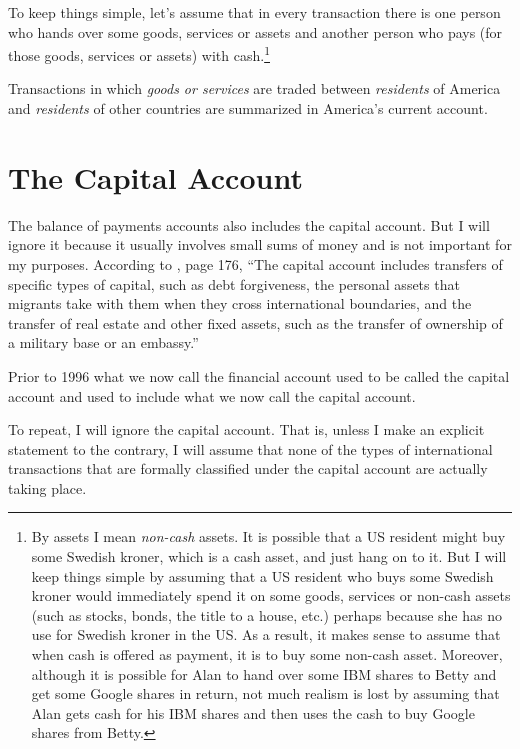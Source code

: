 \documentclass[
  letterpaper,
]{book}
\theoremstyle{plain}
\theoremstyle{remark}
\begin{document}
To keep things simple, let's assume that in every transaction there is
one person who hands over some goods, services or assets and another
person who pays (for those goods, services or assets) with
cash.\footnote{By assets I mean \emph{non-cash} assets. It is possible
  that a US resident might buy some Swedish kroner, which is a cash
  asset, and just hang on to it. But I will keep things simple by
  assuming that a US resident who buys some Swedish kroner would
  immediately spend it on some goods, services or non-cash assets (such
  as stocks, bonds, the title to a house, etc.) perhaps because she has
  no use for Swedish kroner in the US. As a result, it makes sense to
  assume that when cash is offered as payment, it is to buy some
  non-cash asset. Moreover, although it is possible for Alan to hand
  over some IBM shares to Betty and get some Google shares in return,
  not much realism is lost by assuming that Alan gets cash for his IBM
  shares and then uses the cash to buy Google shares from Betty.}

Transactions in which \emph{goods or services} are traded between
\emph{residents} of America and \emph{residents} of other countries are
summarized in America's current
account.

\section{The Capital Account}\label{sec-capacc}

The balance of payments accounts also includes the capital
account. But I will ignore it
because it usually involves small sums of money and is not important for
my purposes. According to \textcite{gerber2002}, page 176, ``The capital
account includes transfers of specific types of capital, such as debt
forgiveness, the personal assets that migrants take with them when they
cross international boundaries, and the transfer of real estate and
other fixed assets, such as the transfer of ownership of a military base
or an embassy.''

Prior to 1996 what we now call the financial account used to be called
the capital account and used to include what we now call the capital
account.

To repeat, I will ignore the capital account. That is, unless I make an
explicit statement to the contrary, I will assume that none of the types
of international transactions that are formally classified under the
capital account are actually taking place.
\end{document}

